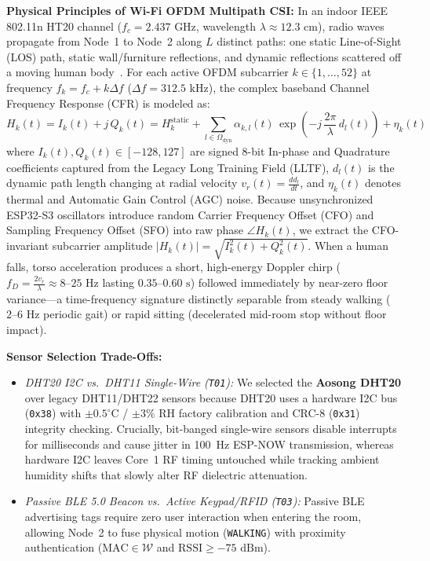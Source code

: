 \documentclass{hcmut-report}
\begin{document}
\textbf{Physical Principles of Wi-Fi OFDM Multipath CSI:} In an indoor IEEE 802.11n HT20 channel ($f_c = 2.437\text{ GHz}$, wavelength $\lambda \approx 12.3\text{ cm}$), radio waves propagate from Node~1 to Node~2 along $L$ distinct paths: one static Line-of-Sight (LOS) path, static wall/furniture reflections, and dynamic reflections scattered off a moving human body~\cite{yousefi_survey,zhang_widar}. For each active OFDM subcarrier $k \in \{1,\dots,52\}$ at frequency $f_k = f_c + k\Delta f$ ($\Delta f = 312.5\text{ kHz}$), the complex baseband Channel Frequency Response (CFR) is modeled as:
\begin{equation}
  H_k(t) = I_k(t) + j\,Q_k(t) = H_k^{\text{static}} + \sum_{l \in \Omega_{\text{dyn}}} \alpha_{k,l}(t)\,\exp\!\left(-j\,\frac{2\pi}{\lambda}\,d_l(t)\right) + \eta_k(t)
  \label{eq:csi_multipath}
\end{equation}
where $I_k(t), Q_k(t) \in [-128, 127]$ are signed 8-bit In-phase and Quadrature coefficients captured from the Legacy Long Training Field (LLTF), $d_l(t)$ is the dynamic path length changing at radial velocity $v_r(t) = \frac{dd_l}{dt}$, and $\eta_k(t)$ denotes thermal and Automatic Gain Control (AGC) noise. Because unsynchronized ESP32-S3 oscillators introduce random Carrier Frequency Offset (CFO) and Sampling Frequency Offset (SFO) into raw phase $\angle H_k(t)$, we extract the CFO-invariant subcarrier amplitude $|H_k(t)| = \sqrt{I_k^2(t) + Q_k^2(t)}$. When a human falls, torso acceleration produces a short, high-energy Doppler chirp ($f_D = \frac{2 v_r}{\lambda} \approx 8\text{--}25\text{ Hz}$ lasting $0.35\text{--}0.60\text{ s}$) followed immediately by near-zero floor variance---a time-frequency signature distinctly separable from steady walking ($2\text{--}6\text{ Hz}$ periodic gait) or rapid sitting (decelerated mid-room stop without floor impact).

\textbf{Sensor Selection Trade-Offs:}
\begin{itemize}
  \item \textit{DHT20 I2C vs.\ DHT11 Single-Wire (\texttt{T01}):} We selected the \textbf{Aosong DHT20} over legacy DHT11/DHT22 sensors because DHT20 uses a hardware I2C bus (\texttt{0x38}) with $\pm 0.5^\circ\text{C}$ / $\pm 3\%\text{ RH}$ factory calibration and CRC-8 (\texttt{0x31}) integrity checking. Crucially, bit-banged single-wire sensors disable interrupts for milliseconds and cause jitter in 100~Hz ESP-NOW transmission, whereas hardware I2C leaves Core~1 RF timing untouched while tracking ambient humidity shifts that slowly alter RF dielectric attenuation.
  \item \textit{Passive BLE 5.0 Beacon vs.\ Active Keypad/RFID (\texttt{T03}):} Passive BLE advertising tags require zero user interaction when entering the room, allowing Node~2 to fuse physical motion (\texttt{WALKING}) with proximity authentication ($\text{MAC} \in \mathcal{W}$ and $\text{RSSI} \ge -75\text{ dBm}$).
\end{itemize}
\end{document}
